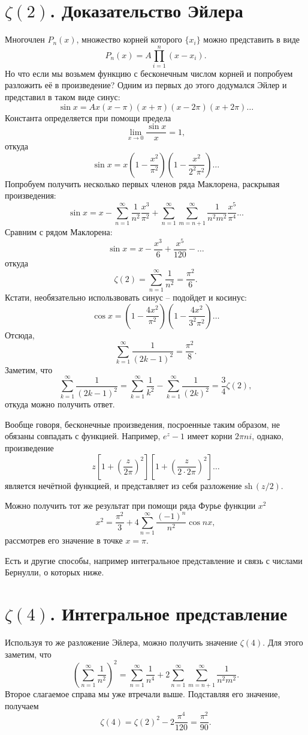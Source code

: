 \section{\( \zeta(2) \). Доказательство Эйлера}
Многочлен \( P_n(x) \), множество корней которого \( \{ x_i \} \) можно представить в виде
\[
    P_n(x) = A\prod\limits_{i=1}^n (x-x_i).
\]
Но что если мы возьмем функцию с бесконечным числом корней и попробуем разложить её в произведение? Одним из первых до этого додумался Эйлер и представил в таком виде синус:
\[
    \sin x = Ax(x-\pi)(x+\pi)(x-2\pi)(x+2\pi)\ldots
\]
Константа определяется при помощи предела
\[
    \lim_{x\to0} \frac{\sin x}{x} = 1,
\]
откуда
\[
    \sin{x} = x\left(1-\frac{x^2}{\pi^2}\right)\left(1-\frac{x^2}{2^2\pi^2}\right)\ldots
\]
Попробуем получить несколько первых членов ряда Маклорена, раскрывая произведения:
\[
    \sin{x} = x - \sum\limits_{n=1}^\infty\frac{1}{n^2}\frac{x^3}{\pi^2} + \sum\limits_{n=1}^\infty\sum\limits_{m=n+1}^\infty\frac{1}{n^2m^2}\frac{x^5}{\pi^4} \ldots
\]
Сравним с рядом Маклорена:
\[
    \sin x = x - \frac{x^3}{6} + \frac{x^5}{120} - \ldots
\]
откуда
\[
    \zeta(2) = \sum\limits_{n=1}^\infty\frac{1}{n^2} = \frac{\pi^2}{6}.
\]
Кстати, необязательно использвовать синус -- подойдет и косинус:
\[
    \cos x = \left(1 - \frac{4x^2}{\pi^2}\right)\left(1 - \frac{4x^2}{3^2\pi^2}\right)\ldots
\]
Отсюда,
\[
    \sum\limits_{k=1}^\infty \frac{1}{(2k-1)^2} = \frac{\pi^2}{8}.
\]
Заметим, что
\[
    \sum\limits_{k=1}^\infty \frac{1}{(2k-1)^2} = \sum\limits_{k=1}^\infty \frac{1}{k^2} - \sum\limits_{k=1}^\infty \frac{1}{(2k)^2} = \frac{3}{4}\zeta(2),
\]
откуда можно получить ответ.

Вообще говоря, бесконечные произведения, посроенные таким образом, не обязаны совпадать с функцией. Например, \( e^z - 1 \) имеет корни \( 2\pi n i \), однако, произведение 
\[
    z\left[1+\left(\frac{z}{2\pi}\right)^2\right]\left[1+\left(\frac{z}{2\cdot2\pi}\right)^2\right]\ldots
\]
является нечётной функцией, и представляет из себя разложение \( \mathrm{sh\,}(z/2) \).

Можно получить тот же результат при помощи ряда Фурье функции \( x^2 \)
\[
    x^2 = \frac{\pi^2}{3} + 4\sum\limits_{n=1}^\infty\frac{(-1)^n}{n^2}\cos nx,
\]
рассмотрев его значение в точке \( x = \pi \).

Есть и другие способы, например интегральное представление и связь с числами Бернулли, о которых ниже.

\section{\(\zeta(4)\). Интегральное представление}
Используя то же разложение Эйлера, можно получить значение \( \zeta(4) \). Для этого заметим, что
\[
    \left(\sum\limits_{n=1}^\infty\frac{1}{n^2}\right)^2 = \sum\limits_{n=1}^\infty\frac{1}{n^4} + 2\sum\limits_{n=1}^\infty\sum\limits_{m=n+1}^\infty\frac{1}{n^2m^2}.
\]
Второе слагаемое справа мы уже втречали выше. Подставляя его значение, получаем
\[
    \zeta(4) = \zeta(2)^2 - 2\frac{\pi^4}{120} = \frac{\pi^2}{90}.
\]

